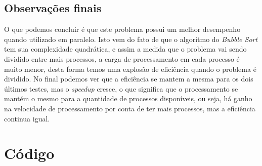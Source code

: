 \documentclass[12pt]{article}
\begin{document}
{\begin{multicols}{2}
\section{Observações finais}
O que podemos concluir é que este problema possui um melhor desempenho quando utilizado em paralelo. Isto vem do fato de que o algoritmo do \textit{Bubble Sort} tem sua complexidade quadrática, e assim a medida que o problema vai sendo dividido entre mais processos, a carga de processamento em cada processo é muito menor, desta forma temos uma explosão de eficiência quando o problema é dividido. No final podemos ver que a eficiência se mantem a mesma para os dois últimos testes, mas o \textit{speedup} cresce, o que significa que o processamento se mantém o mesmo para a quantidade de processos disponíveis, ou seja, há ganho na velocidade de processamento por conta de ter mais processos, mas a eficiência continua igual.  

\end{multicols}

\newpage{}
\section{Código}

}
\end{document}
